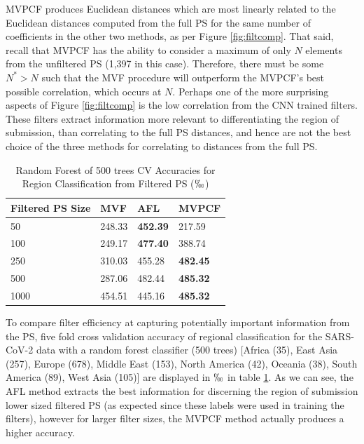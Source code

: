 \documentclass[10pt,conference]{IEEEtran}
\begin{document}
\noindent MVPCF produces Euclidean distances which are most linearly related to the Euclidean distances computed from the full PS for the same number of coefficients in the other two methods, as per Figure \ref{fig:filtcomp}.
That said, recall that MVPCF has the ability to consider a maximum of only $N$ elements from the unfiltered PS (1,397 in this case).  Therefore, there must be some $N^* > N$ such that the MVF procedure will outperform the MVPCF's best possible correlation, which occurs at $N$. 
Perhaps one of the more surprising aspects of Figure \ref{fig:filtcomp} is the low correlation from the CNN trained filters.  
These filters extract information more relevant to differentiating the region of submission, than correlating to the full PS distances, and hence are not the best choice of the three methods for correlating to distances from the full PS.

\begin{table}[h!]
\centering
\caption{Random Forest of 500 trees CV Accuracies for Region Classification from Filtered PS ($\permil$)\label{tab:acc}} 
\begin{tabular}{|l | l | l | l|}
\hline 
\textbf{Filtered PS Size} & \textbf{MVF} & \textbf{AFL} & \textbf{MVPCF}\\ 
\hline 
\hline 
50 & 248.33 & \textbf{452.39} & 217.59\\ 
\hline
100 & 249.17 & \textbf{477.40} & 388.74 \\
\hline
250 & 310.03& 455.28 & \textbf{482.45} \\
\hline
500 & 287.06 & 482.44 & \textbf{485.32}\\
\hline
1000 & 454.51 & 445.16 & \textbf{485.32} \\
\hline
\end{tabular} 
\end{table}
 
 To compare filter efficiency at capturing potentially important information from the PS, five fold cross validation accuracy  of regional classification for the SARS-CoV-2 data with a random forest classifier (500 trees) [Africa (35), East Asia (257), Europe (678), Middle East (153), North America (42), Oceania (38), South America (89), West Asia (105)] are displayed in $\permil$ in table \ref{tab:acc}.  As we can see, the AFL method extracts the best information for discerning the region of submission lower sized filtered PS (as expected since these labels were used in training the filters), however for larger filter sizes, the MVPCF method actually produces a higher accuracy.  
 \vspace{-1 em}
\end{document}
